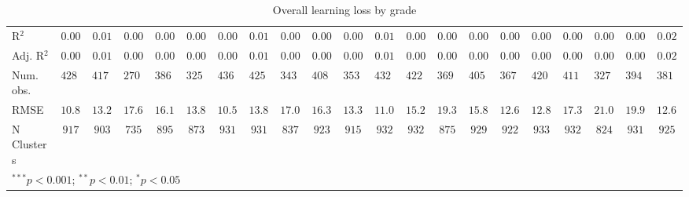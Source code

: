 \begin{table}
\begin{center}
\begin{tabular}{l c c c c c c c c c c c c c c c c c c c c}
\hline
R$^2$                     & $0.00$        & $0.01$        & $0.00$        & $0.00$      & $0.00$   & $0.00$        & $0.01$        & $0.00$        & $0.00$      & $0.00$     & $0.01$        & $0.00$        & $0.00$        & $0.00$        & $0.00$       & $0.00$        & $0.00$        & $0.00$       & $0.00$        & $0.02$       \\
Adj. R$^2$                & $0.00$        & $0.01$        & $0.00$        & $0.00$      & $0.00$   & $0.00$        & $0.01$        & $0.00$        & $0.00$      & $0.00$     & $0.01$        & $0.00$        & $0.00$        & $0.00$        & $0.00$       & $0.00$        & $0.00$        & $0.00$       & $0.00$        & $0.02$       \\
Num. obs.                 & $42820$       & $41702$       & $27022$       & $38694$     & $32544$  & $43670$       & $42546$       & $34346$       & $40859$     & $35319$    & $43272$       & $42238$       & $36961$       & $40510$       & $36708$      & $42075$       & $41116$       & $32778$      & $39433$       & $38101$      \\
RMSE                      & $10.83$       & $13.29$       & $17.68$       & $16.14$     & $13.84$  & $10.50$       & $13.80$       & $17.04$       & $16.38$     & $13.30$    & $11.01$       & $15.20$       & $19.36$       & $15.83$       & $12.69$      & $12.83$       & $17.35$       & $21.03$      & $19.94$       & $12.68$      \\
N Clusters                & $917$         & $903$         & $735$         & $895$       & $873$    & $931$         & $931$         & $837$         & $923$       & $915$      & $932$         & $932$         & $875$         & $929$         & $922$        & $933$         & $932$         & $824$        & $931$         & $925$        \\
\hline
\multicolumn{21}{l}{\scriptsize{$^{***}p<0.001$; $^{**}p<0.01$; $^{*}p<0.05$}}
\end{tabular}
\caption{Overall learning loss by grade}
\label{table:grade}
\end{center}
\end{table}
